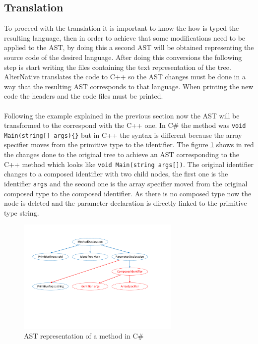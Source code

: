 \subsection{Translation}\label{SS:AN-Process-Translation}
To proceed with the translation it is important to know the how is typed the resulting language, then in order to achieve that some modifications need to be applied to the AST, by doing this a second AST will be obtained representing the source code of the desired language. After doing this conversions the following step is start writing the files containing the text representation of the tree. AlterNative translates the code to C++ so the AST changes must be done in a way that the resulting AST corresponds to that language. When printing the new code the headers and the code files must be printed.
\\
\\
Following the example explained in the previous section now the AST will be transformed to the correspond with the C++ one. In C\# the method was \verb!void Main(string[] args){}! but in C++ the syntax is different because the array specifier moves from the primitive type to the identifier. The figure \ref{fig:AN-AST-Conversions} shows in red the changes done to the original tree to achieve an AST corresponding to the C++ method which looks like \verb!void Main(string args[])!. The original identifier changes to a composed identifier with two child nodes, the first one is the identifier \verb!args! and the second one is the array specifier moved from the original composed type to the composed identifier. As there is no composed type now the node is deleted and the parameter declaration is directly linked to the primitive type string.
\begin{figure}[H]\begin{center}
 \centering
  \captionsetup{justification=centering}
  \includegraphics[width=0.7\textwidth]{pictures/alternative/ast_conversions_cpp}
  \caption{AST representation of a method in C\#\label{fig:AN-AST-Conversions}}
\end{center}\end{figure}


